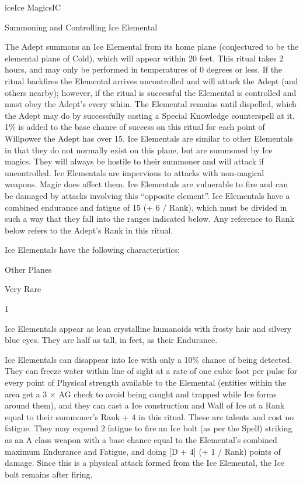 \begin{College}[1.5]{ice}{Ice Magics}{IC}
\begin{ritual}[R-2]{Summoning and Controlling Ice Elemental}
\begin{effects}
The Adept summons an Ice Elemental from its home plane (conjectured to
be the elemental plane of Cold), which will appear within 20 feet.
This ritual takes 2 hours, and may only be performed in temperatures
of 0 degrees or less.  If the ritual backfires the Elemental arrives
uncontrolled and will attack the Adept (and others nearby); however,
if the ritual is successful the Elemental is controlled and must obey
the Adept’s every whim.  The Elemental remains until dispelled, which
the Adept may do by successfully casting a Special Knowledge
counterspell at it. 1\% is added to the base chance of success on this
ritual for each point of Willpower the Adept has over 15.  Ice
Elementals are similar to other Elementals in that they do not
normally exist on this plane, but are summoned by Ice magics. They
will always be hostile to their summoner and will attack if
uncontrolled.  Ice Elementals are impervious to attacks with
non-magical weapons.  Magic does affect them. Ice Elementals are
vulnerable to fire and can be damaged by attacks involving this
“opposite element”.  Ice Elementals have a combined endurance and
fatigue of 15 (+ 6 / Rank), which must be divided in such a way that
they fall into the ranges indicated below.  Any reference to Rank
below refers to the Adept’s Rank in this ritual.

Ice Elementals have the following characteristics: 
\begin{Description}
\item[Habitat] Other Planes  

\item[Frequency] Very Rare  

\item[Number] 1 

\item[Description] Ice Elementals appear as lean crystalline humanoids
  with frosty hair and silvery blue eyes.  They are half as tall, in
  feet, as their Endurance.

\item[Talents, Skills and Magic] Ice Elementals can disappear into Ice
  with only a 10\% chance of being detected. They can freeze water
  within line of sight at a rate of one cubic foot per pulse for every
  point of Physical strength available to the Elemental (entities
  within the area get a 3 × AG check to avoid being caught and trapped
  while Ice forms around them), and they can cast a Ice construction
  and Wall of Ice at a Rank equal to their summoner’s Rank + 4 in this
  ritual.  These are talents and cost no fatigue. They may expend 2
  fatigue to fire an Ice bolt (as per the Spell) striking as an A
  class weapon with a base chance equal to the Elemental’s combined
  maximum Endurance and Fatigue, and doing [D + 4] (+ 1 / Rank) points
  of damage.  Since this is a physical attack formed from the Ice
  Elemental, the Ice bolt remains after firing.


\end{Description}
\end{effects}
\end{ritual}
\end{College}
